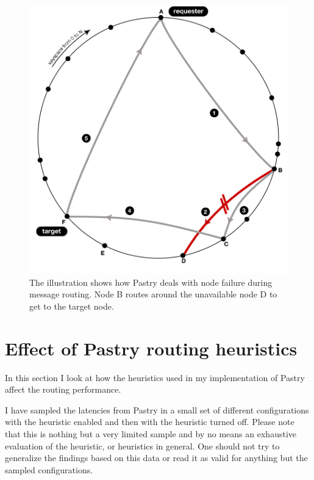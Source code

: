 \begin{figure}[!htb]
\begin{center}
  \includegraphics[width=0.9\linewidth]{illustrations/PastryRoutingFailed.png}
  \caption{The illustration shows how Pastry deals with node failure during message routing. Node B routes around the unavailable node D to get to the target node.}
  \label{figurePastryFailedLookup}
\end{center}
\end{figure}


\section{Effect of Pastry routing heuristics}
In this section I look at how the heuristics used in my implementation of Pastry affect the routing performance. 

I have sampled the latencies from Pastry in a small set of different configurations with the heuristic enabled and then with the heuristic turned off. Please note that this is nothing but a very limited sample and by no means an exhaustive evaluation of the heuristic, or heuristics in general. One should not try to generalize the findings based on this data or read it as valid for anything but the sampled configurations.

